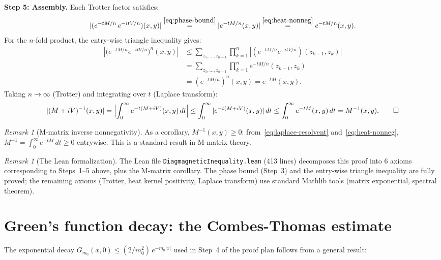 \documentclass[12pt]{article}
\theoremstyle{definition}
\theoremstyle{remark}
\newtheorem{remark}[theorem]{Remark}
\begin{document}
\medskip\noindent\textbf{Step 5: Assembly.}
Each Trotter factor satisfies:
\begin{equation}
  |(e^{-tM/n}\,e^{-itV/n})(x,y)|
  \stackrel{\eqref{eq:phase-bound}}{=} |e^{-tM/n}(x,y)|
  \stackrel{\eqref{eq:heat-nonneg}}{=} e^{-tM/n}(x,y).
\end{equation}
For the $n$-fold product, the entry-wise triangle inequality gives:
\begin{align}
  |\bigl(e^{-tM/n}e^{-itV/n}\bigr)^n(x,y)|
  &\le \sum_{z_1,\ldots,z_{n-1}}
    \prod_{k=1}^n |(e^{-tM/n}e^{-itV/n})(z_{k-1},z_k)| \\
  &= \sum_{z_1,\ldots,z_{n-1}}
    \prod_{k=1}^n e^{-tM/n}(z_{k-1},z_k) \\
  &= (e^{-tM/n})^n(x,y) = e^{-tM}(x,y).
\end{align}
Taking $n \to \infty$ (Trotter) and integrating over $t$
(Laplace transform):
\begin{equation}
  |(M+iV)^{-1}(x,y)|
  = \Bigl|\int_0^\infty e^{-t(M+iV)}(x,y)\,dt\Bigr|
  \le \int_0^\infty |e^{-t(M+iV)}(x,y)|\,dt
  \le \int_0^\infty e^{-tM}(x,y)\,dt
  = M^{-1}(x,y). \qed
\end{equation}

\begin{remark}[M-matrix inverse nonnegativity]
As a corollary, $M^{-1}(x,y) \ge 0$: from~\eqref{eq:laplace-resolvent}
and~\eqref{eq:heat-nonneg}, $M^{-1} = \int_0^\infty e^{-tM}\,dt
\ge 0$ entrywise. This is a standard result in M-matrix theory.
\end{remark}

\begin{remark}[The Lean formalization]
The Lean file \texttt{DiagmagneticInequality.lean} (413 lines)
decomposes this proof into 6 axioms corresponding to Steps~1--5
above, plus the M-matrix corollary. The phase bound (Step~3) and
the entry-wise triangle inequality are fully proved; the remaining
axioms (Trotter, heat kernel positivity, Laplace transform) use
standard Mathlib tools (matrix exponential, spectral theorem).
\end{remark}

\section{Green's function decay: the Combes-Thomas estimate}
\label{sec:combes_thomas}

The exponential decay $G_{m_0}(x,0) \le (2/m_0^2)\,e^{-m_0|x|}$
used in Step~4 of the proof plan follows from a general result:
\end{document}
